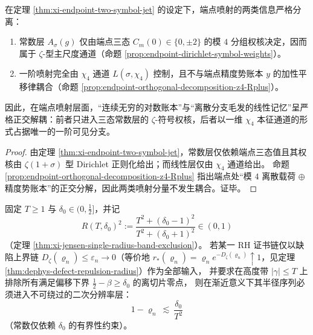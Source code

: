\begin{corollary}\label{cor:xi-endpoint-jet-orthogonal-decoupling}
在定理 \ref{thm:xi-endpoint-two-symbol-jet} 的设定下，端点喷射的两类信息严格分离：
\begin{enumerate}
  \item 常数层 \(A_\sigma(g)\) 仅由端点三态 \(C_m(0)\in\{0,\pm 2\}\) 的模 \(4\) 分组权核决定，因而属于 \(\zeta\)-型主尺度通道（命题 \ref{prop:endpoint-dirichlet-symbol-weights}）。
  \item 一阶喷射完全由 \(\chi_4\) 通道 \(L(\sigma,\chi_4)\) 控制，且不与端点精度势账本 \(y\) 的加性平移律耦合（命题 \ref{prop:endpoint-orthogonal-decomposition-z4-Rplus}）。
\end{enumerate}
因此，在端点喷射层面，“连续无穷的对数账本”与“离散分支毛发的线性记忆”呈严格正交解耦：前者只进入三态常数层的 \(\zeta\)-符号权核，后者以一维 \(\chi_4\) 本征通道的形式占据唯一的一阶可见分支。
\end{corollary}

\begin{proof}
由定理 \ref{thm:xi-endpoint-two-symbol-jet}，常数层仅依赖端点三态值且其权核由 \(\zeta(1+\sigma)\) 型 Dirichlet 正则化给出；而线性层仅由 \(\chi_4\) 通道给出。
命题 \ref{prop:endpoint-orthogonal-decomposition-z4-Rplus} 指出端点处“模 \(4\) 离散载荷 \(\oplus\) 精度势账本”的正交分解，因此两类喷射分量不发生耦合。证毕。
\end{proof}

\begin{theorem}\label{thm:xi-jensen-quadratic-resolution-barrier}
固定 \(T\ge 1\) 与 \(\delta_0\in(0,\tfrac12]\)，并记
\[
R(T,\delta_0)^2:=\frac{T^2+(\delta_0-1)^2}{T^2+(\delta_0+1)^2}\in(0,1)
\]
（定理 \ref{thm:xi-jensen-single-radius-band-exclusion}）。
若某一 RH 证书链仅以缺陷上界链 \(D_\zeta(\varrho_n)\le \varepsilon_n\to 0\)（等价地 \(r_\ast(\varrho_n)=\varrho_n e^{-D_\zeta(\varrho_n)}\uparrow 1\)，见定理 \ref{thm:dephys-defect-repulsion-radius}）作为全部输入，
并要求在高度带 \(|\gamma|\le T\) 上排除所有满足偏移下界 \(\tfrac12-\beta\ge\delta_0\) 的离切片零点，
则在渐近意义下其半径序列必须进入不可绕过的二次分辨率层：
\begin{equation}\label{eq:xi-jensen-quadratic-resolution-barrier}
\boxed{\;
1-\varrho_n\ \lesssim\ \frac{\delta_0}{T^2}\;}
\end{equation}
（常数仅依赖 \(\delta_0\) 的有界性约束）。
\end{theorem}


